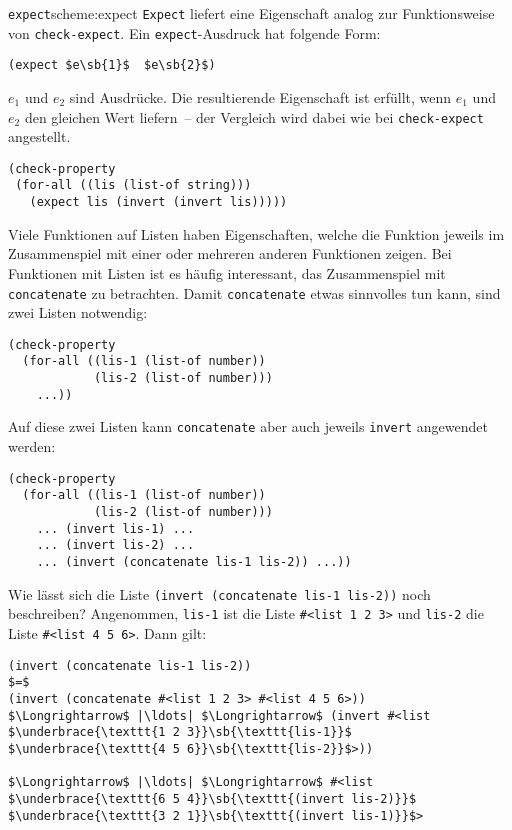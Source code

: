 \begin{feature}{\lstinline{expect}}{scheme:expect}
  \lstinline{Expect} liefert eine
  Eigenschaft analog zur Funktionsweise von
  \lstinline{check-expect}.  Ein \lstinline{expect}-Ausdruck hat folgende
  Form:
\begin{lstlisting}
(expect $e\sb{1}$  $e\sb{2}$)
\end{lstlisting}
%
$e_1$ und $e_2$ sind Ausdrücke.  Die resultierende Eigenschaft ist
erfüllt, wenn $e_1$ und $e_2$ den gleichen Wert liefern~-- der
Vergleich wird dabei wie bei \lstinline{check-expect} angestellt.

\end{feature}

\begin{lstlisting}
(check-property
 (for-all ((lis (list-of string)))
   (expect lis (invert (invert lis)))))
\end{lstlisting}
%
Viele Funktionen auf Listen haben Eigenschaften, welche die Funktion
jeweils im Zusammenspiel mit einer oder mehreren anderen Funktionen
zeigen.  Bei Funktionen mit Listen ist es häufig interessant, das
Zusammenspiel mit \lstinline{concatenate} zu betrachten.  Damit
\lstinline{concatenate} etwas sinnvolles tun kann, sind zwei Listen
notwendig:
%
\begin{lstlisting}
(check-property
  (for-all ((lis-1 (list-of number))
            (lis-2 (list-of number)))
    ...))
\end{lstlisting}
%
Auf diese zwei Listen kann \lstinline{concatenate} aber auch jeweils
\lstinline{invert} angewendet werden:
%
%
\begin{lstlisting}
(check-property
  (for-all ((lis-1 (list-of number))
            (lis-2 (list-of number)))
    ... (invert lis-1) ...
    ... (invert lis-2) ...
    ... (invert (concatenate lis-1 lis-2)) ...))
\end{lstlisting}
%
Wie lässt sich die Liste \lstinline{(invert (concatenate lis-1 lis-2))}
noch beschreiben?
Angenommen, \lstinline{lis-1} ist die Liste \lstinline{#<list 1 2 3>} und
\lstinline{lis-2} die Liste \lstinline{#<list 4 5 6>}.  Dann gilt:
%
\begin{lstlisting}
(invert (concatenate lis-1 lis-2))
$=$
(invert (concatenate #<list 1 2 3> #<list 4 5 6>))
$\Longrightarrow$ |\ldots| $\Longrightarrow$ (invert #<list $\underbrace{\texttt{1 2 3}}\sb{\texttt{lis-1}}$ $\underbrace{\texttt{4 5 6}}\sb{\texttt{lis-2}}$>))

$\Longrightarrow$ |\ldots| $\Longrightarrow$ #<list $\underbrace{\texttt{6 5 4}}\sb{\texttt{(invert lis-2)}}$ $\underbrace{\texttt{3 2 1}}\sb{\texttt{(invert lis-1)}}$>
\end{lstlisting}
